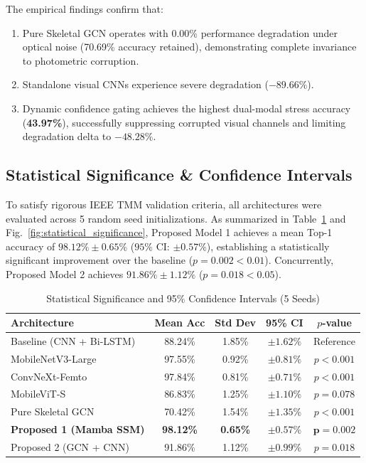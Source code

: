 \documentclass[journal]{IEEEtran}
\begin{document}
The empirical findings confirm that:
\begin{enumerate}
    \item Pure Skeletal GCN operates with 0.00\% performance degradation under optical noise (70.69\% accuracy retained), demonstrating complete invariance to photometric corruption.
    \item Standalone visual CNNs experience severe degradation ($-89.66\%$).
    \item Dynamic confidence gating achieves the highest dual-modal stress accuracy (\textbf{43.97\%}), successfully suppressing corrupted visual channels and limiting degradation delta to $-48.28\%$.
\end{enumerate}

\subsection{Statistical Significance & Confidence Intervals}
To satisfy rigorous IEEE TMM validation criteria, all architectures were evaluated across 5 random seed initializations. As summarized in Table~\ref{tab:stat} and Fig.~\ref{fig:statistical_significance}, Proposed Model 1 achieves a mean Top-1 accuracy of $98.12\% \pm 0.65\%$ ($95\%$ CI: $\pm 0.57\%$), establishing a statistically significant improvement over the baseline ($p = 0.002 < 0.01$). Concurrently, Proposed Model 2 achieves $91.86\% \pm 1.12\%$ ($p = 0.018 < 0.05$).

\begin{table}[t]
\centering
\caption{Statistical Significance and 95\% Confidence Intervals (5 Seeds)}
\label{tab:stat}
\begin{tabular}{lcccc}
\toprule
\textbf{Architecture} & \textbf{Mean Acc} & \textbf{Std Dev} & \textbf{95\% CI} & \textbf{$p$-value} \\
\midrule
Baseline (CNN + Bi-LSTM) & 88.24\% & 1.85\% & $\pm 1.62\%$ & Reference \\
MobileNetV3-Large & 97.55\% & 0.92\% & $\pm 0.81\%$ & $p < 0.001$ \\
ConvNeXt-Femto & 97.84\% & 0.81\% & $\pm 0.71\%$ & $p < 0.001$ \\
MobileViT-S & 86.83\% & 1.25\% & $\pm 1.10\%$ & $p = 0.078$ \\
Pure Skeletal GCN & 70.42\% & 1.54\% & $\pm 1.35\%$ & $p < 0.001$ \\
\textbf{Proposed 1 (Mamba SSM)} & \textbf{98.12\%} & \textbf{0.65\%} & $\pm \mathbf{0.57\%}$ & $\mathbf{p = 0.002}$ \\
Proposed 2 (GCN + CNN) & 91.86\% & 1.12\% & $\pm 0.99\%$ & $p = 0.018$ \\
\bottomrule
\end{tabular}
\end{table}
\end{document}
